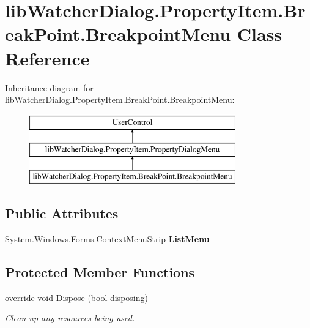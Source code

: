 \hypertarget{classlib_watcher_dialog_1_1_property_item_1_1_break_point_1_1_breakpoint_menu}{\section{lib\+Watcher\+Dialog.\+Property\+Item.\+Break\+Point.\+Breakpoint\+Menu Class Reference}
\label{classlib_watcher_dialog_1_1_property_item_1_1_break_point_1_1_breakpoint_menu}
}
Inheritance diagram for lib\+Watcher\+Dialog.\+Property\+Item.\+Break\+Point.\+Breakpoint\+Menu\+:\begin{figure}[H]
\begin{center}
\leavevmode
\includegraphics[height=3.000000cm]{classlib_watcher_dialog_1_1_property_item_1_1_break_point_1_1_breakpoint_menu}
\end{center}
\end{figure}
\subsection*{Public Attributes}
\begin{DoxyCompactItemize}
\item 
\hypertarget{classlib_watcher_dialog_1_1_property_item_1_1_break_point_1_1_breakpoint_menu_a47c622825bbe31ac121dfdf53023da35}{System.\+Windows.\+Forms.\+Context\+Menu\+Strip {\bfseries List\+Menu}}\label{classlib_watcher_dialog_1_1_property_item_1_1_break_point_1_1_breakpoint_menu_a47c622825bbe31ac121dfdf53023da35}

\end{DoxyCompactItemize}
\subsection*{Protected Member Functions}
\begin{DoxyCompactItemize}
\item 
override void \hyperlink{classlib_watcher_dialog_1_1_property_item_1_1_break_point_1_1_breakpoint_menu_ac7be6c470045cffd84c2fe89974d99b7}{Dispose} (bool disposing)
\begin{DoxyCompactList}\small\item\em Clean up any resources being used. \end{DoxyCompactList}\end{DoxyCompactItemize}
